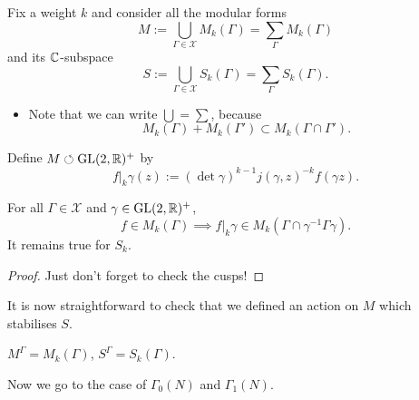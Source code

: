 Fix a weight $k$ and consider all the modular forms \[M := \bigcup_{\Gamma\in\mathscr{X}} M_k(\Gamma) = \sum_{\Gamma} M_k(\Gamma)\]
and its $\mathbb{C}$-subspace \[S := \bigcup_{\Gamma\in\mathscr{X}} S_k(\Gamma) = \sum_{\Gamma} S_k(\Gamma).\]
\begin{itemize}
    \item Note that we can write $\bigcup = \sum$, because \[M_k(\Gamma) + M_k(\Gamma')\subset M_k(\Gamma\cap\Gamma').\]
\end{itemize}
Define $M\boldsymbol{\circlearrowleft} \operatorname{GL}(2, \mathbb{R})^+$ by \[f|_k\gamma(z) := (\det \gamma)^{k-1}j(\gamma, z)^{-k} f(\gamma z).\]
\begin{lemma}
    For all $\Gamma\in\mathscr{X}$ and $\gamma\in\operatorname{GL}(2, \mathbb{R})^+$, \[f\in M_k(\Gamma)\implies f|_k\gamma\in M_k(\Gamma\cap\gamma^{-1}\Gamma\gamma).\]
    It remains true for $S_k$.
\end{lemma}
\begin{proof}
    Just don't forget to check the cusps!
\end{proof}
It is now straightforward to check that we defined an action on $M$ which stabilises $S$.
\begin{lemma}
    $M^\Gamma = M_k(\Gamma)$, $S^\Gamma = S_k(\Gamma)$.
\end{lemma}
Now we go to the case of $\Gamma_0(N)$ and $\Gamma_1(N)$.

